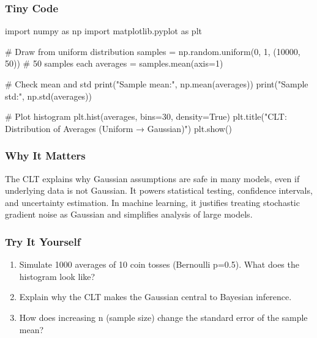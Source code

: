 \documentclass[
  letterpaper,
  DIV=11,
  numbers=noendperiod]{scrreprt}
\newenvironment{Shaded}{\begin{snugshade}}{\end{snugshade}}
\newcommand{\BuiltInTok}[1]{\textcolor[rgb]{0.00,0.23,0.31}{#1}}
\newcommand{\CommentTok}[1]{\textcolor[rgb]{0.37,0.37,0.37}{#1}}
\newcommand{\DecValTok}[1]{\textcolor[rgb]{0.68,0.00,0.00}{#1}}
\newcommand{\ImportTok}[1]{\textcolor[rgb]{0.00,0.46,0.62}{#1}}
\newcommand{\NormalTok}[1]{\textcolor[rgb]{0.00,0.23,0.31}{#1}}
\newcommand{\OperatorTok}[1]{\textcolor[rgb]{0.37,0.37,0.37}{#1}}
\newcommand{\StringTok}[1]{\textcolor[rgb]{0.13,0.47,0.30}{#1}}
\newcommand{\VariableTok}[1]{\textcolor[rgb]{0.07,0.07,0.07}{#1}}
\providecommand{\tightlist}{%
  \setlength{\itemsep}{0pt}\setlength{\parskip}{0pt}}
\begin{document}
\subsubsection{Tiny Code}\label{tiny-code-127}

\begin{Shaded}
\begin{Highlighting}[]
\ImportTok{import}\NormalTok{ numpy }\ImportTok{as}\NormalTok{ np}
\ImportTok{import}\NormalTok{ matplotlib.pyplot }\ImportTok{as}\NormalTok{ plt}

\CommentTok{\# Draw from uniform distribution}
\NormalTok{samples }\OperatorTok{=}\NormalTok{ np.random.uniform(}\DecValTok{0}\NormalTok{, }\DecValTok{1}\NormalTok{, (}\DecValTok{10000}\NormalTok{, }\DecValTok{50}\NormalTok{))  }\CommentTok{\# 50 samples each}
\NormalTok{averages }\OperatorTok{=}\NormalTok{ samples.mean(axis}\OperatorTok{=}\DecValTok{1}\NormalTok{)}

\CommentTok{\# Check mean and std}
\BuiltInTok{print}\NormalTok{(}\StringTok{"Sample mean:"}\NormalTok{, np.mean(averages))}
\BuiltInTok{print}\NormalTok{(}\StringTok{"Sample std:"}\NormalTok{, np.std(averages))}

\CommentTok{\# Plot histogram}
\NormalTok{plt.hist(averages, bins}\OperatorTok{=}\DecValTok{30}\NormalTok{, density}\OperatorTok{=}\VariableTok{True}\NormalTok{)}
\NormalTok{plt.title(}\StringTok{"CLT: Distribution of Averages (Uniform → Gaussian)"}\NormalTok{)}
\NormalTok{plt.show()}
\end{Highlighting}
\end{Shaded}

\subsubsection{Why It Matters}\label{why-it-matters-25}

The CLT explains why Gaussian assumptions are safe in many models, even
if underlying data is not Gaussian. It powers statistical testing,
confidence intervals, and uncertainty estimation. In machine learning,
it justifies treating stochastic gradient noise as Gaussian and
simplifies analysis of large models.

\subsubsection{Try It Yourself}\label{try-it-yourself-127}

\begin{enumerate}
\def\labelenumi{\arabic{enumi}.}
\tightlist
\item
  Simulate 1000 averages of 10 coin tosses (Bernoulli p=0.5). What does
  the histogram look like?
\item
  Explain why the CLT makes the Gaussian central to Bayesian inference.
\item
  How does increasing n (sample size) change the standard error of the
  sample mean?
\end{enumerate}
\end{document}
